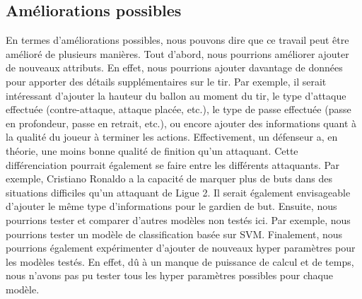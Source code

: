 \documentclass[12pt]{article}
\begin{document}
\subsection{Améliorations possibles}
En termes d'améliorations possibles, nous pouvons dire que ce travail peut être amélioré de plusieurs manières.
Tout d'abord, nous pourrions améliorer ajouter de nouveaux attributs.
En effet, nous pourrions ajouter davantage de données pour apporter des détails supplémentaires sur le tir.
Par exemple, il serait intéressant d'ajouter la hauteur du ballon au moment du tir, le type d'attaque effectuée (contre-attaque, attaque placée, etc.), le type de passe effectuée (passe en profondeur, passe en retrait, etc.), ou encore ajouter des informations quant à la qualité du joueur à terminer les actions.
Effectivement, un défenseur a, en théorie, une moins bonne qualité de finition qu'un attaquant. 
Cette différenciation pourrait également se faire entre les différents attaquants. 
Par exemple, Cristiano Ronaldo a la capacité de marquer plus de buts dans des situations difficiles qu'un attaquant de Ligue 2.
Il serait également envisageable d'ajouter le même type d'informations pour le gardien de but.
\newline\newline
Ensuite, nous pourrions tester et comparer d'autres modèles non testés ici.
Par exemple, nous pourrions tester un modèle de classification basée sur SVM.
Finalement, nous pourrions également expérimenter d'ajouter de nouveaux hyper paramètres pour les modèles testés.
En effet, dû à un manque de puissance de calcul et de temps, nous n'avons pas pu tester tous les hyper paramètres possibles pour chaque modèle.
\newpage



\end{document}

